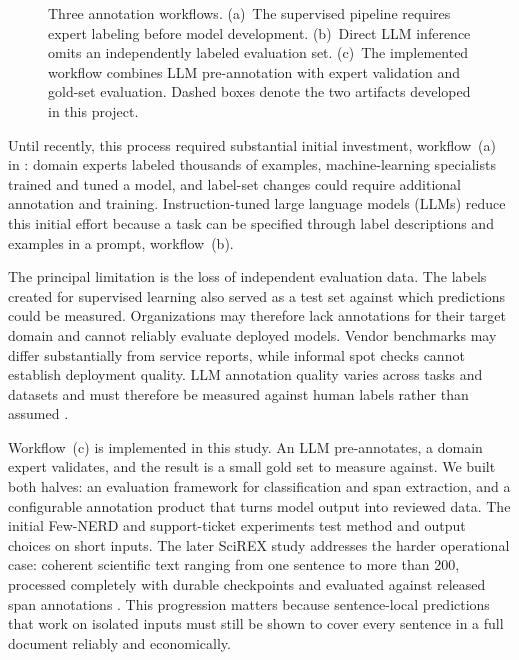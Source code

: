 \begin{figure}[!t]
{%
}
\caption{Three annotation workflows. (a)~The supervised pipeline requires
expert labeling before model development. (b)~Direct LLM inference omits an
independently labeled evaluation set. (c)~The implemented workflow combines
LLM pre-annotation with expert validation and gold-set evaluation. Dashed
boxes denote the two artifacts developed in this project.}
\label{fig:workflows}
\end{figure}

Until recently, this process required substantial initial investment,
workflow~(a) in : domain experts labeled thousands of
examples, machine-learning specialists trained and tuned a model, and label-set
changes could require additional annotation and training. Instruction-tuned
large language models (LLMs) reduce this initial effort because a task can be
specified through label descriptions and examples in a prompt, workflow~(b).

The principal limitation is the loss of independent evaluation data. The
labels created for supervised learning also served as a test set against which
predictions could be measured. Organizations may therefore lack annotations
for their target domain and cannot reliably evaluate deployed models. Vendor
benchmarks may differ substantially from service reports, while informal spot
checks cannot establish deployment quality. LLM annotation quality varies
across tasks and datasets and must therefore be measured against human labels
rather than assumed
\citep{pangakis2023validation, reiss2023testing}.

Workflow~(c) is implemented in this study. An LLM pre-annotates, a domain expert
validates, and the result is a small gold set to measure against. We built both
halves: an evaluation framework for classification and span extraction, and a
configurable annotation product that turns model output into reviewed data.
The initial Few-NERD and support-ticket experiments test method and output
choices on short inputs. The later SciREX study addresses the harder operational
case: coherent scientific text ranging from one sentence to more than 200,
processed completely with durable checkpoints and evaluated against released
span annotations \citep{jain2020scirex}. This progression matters because
sentence-local predictions that work on isolated inputs must still be shown to
cover every sentence in a full document reliably and economically.


